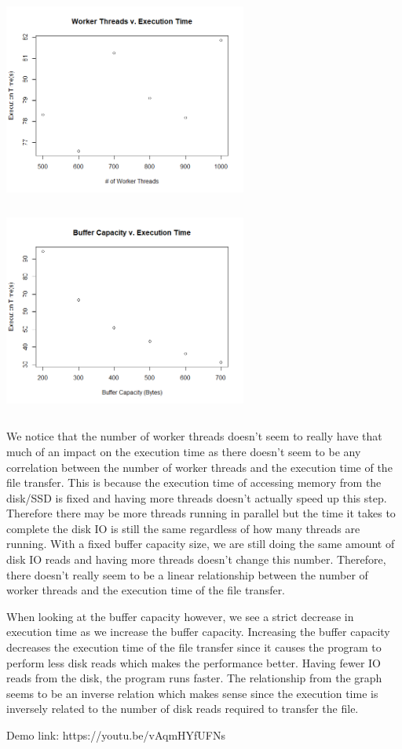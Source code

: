 \documentclass[12pt]{article}
\begin{document}
\begin{center}
\includegraphics[width=8cm, height=7cm]{PA4_WT_F}
\includegraphics[width=8cm, height=7cm]{PA4_BT_F}
\end{center}

We notice that the number of worker threads doesn't seem to really have that much of an impact on the execution time as there doesn't seem to be any correlation between the number of worker threads and the execution time of the file transfer. This is because the execution time of accessing memory from the disk/SSD is fixed and having more threads doesn't actually speed up this step. Therefore there may be more threads running in parallel but the time it takes to complete the disk IO is still the same regardless of how many threads are running. With a fixed buffer capacity size, we are still doing the same amount of disk IO reads and having more threads doesn't change this number. Therefore, there doesn't really seem to be a linear relationship between the number of worker threads and the execution time of the file transfer. 

When looking at the buffer capacity however, we see a strict decrease in execution time as we increase the buffer capacity. Increasing the buffer capacity decreases the execution time of the file transfer since it causes the program to perform less disk reads which makes the performance better. Having fewer IO reads from the disk, the program runs faster. The relationship from the graph seems to be an inverse relation which makes sense since the execution time is inversely related to the number of disk reads required to transfer the file. 

Demo link: https://youtu.be/vAqmHYfUFNs
\end{document}

